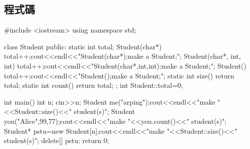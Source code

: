 \subsection{程式碼}
\begin{cppcode}
	#include <iostream>
	using namespace std;
	
	class Student{
		public:
		static int total;
		Student(char*) {
			total++;cout<<endl<<"Student(char*);make a Student;";
		}
		Student(char*, int, int) {
			total++;cout<<endl<<"Student(char*,int,int);make a Student;";
		}
		Student() {
			total++;cout<<endl<<"Student();make a Student;";
		}
		static int size() {
			return total;
		}
		static int count() {
			return total;
		}
	};
	int Student::total=0;
	
	int main(){
		int n;
		cin>>n;
		Student me("arping");cout<<endl<<"make "<<Student::size()<<" student(s)";
		Student you("Alice",99,77);cout<<endl<<"make "<<you.count()<<" student(s)";
		Student* pstu=new Student[n];cout<<endl<<"make "<<Student::size()<<" student(s)";
		delete[] pstu;
		return 0;
	}
	
	
\end{cppcode}
